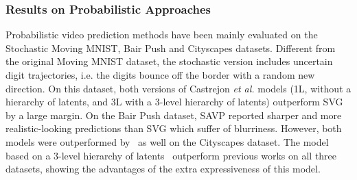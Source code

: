 \subsubsection{Results on Probabilistic Approaches}
Probabilistic video prediction methods have been mainly evaluated on the Stochastic Moving MNIST, Bair Push and Cityscapes datasets. Different from the original Moving MNIST dataset, the stochastic version includes uncertain digit trajectories, i.e. the digits bounce off the border with a random new direction. On this dataset, both versions of Castrejon \textit{et al.} models (1L, without a hierarchy of latents, and 3L with a 3-level hierarchy of latents) outperform \ac{SVG} by a large margin. On the Bair Push dataset, \ac{SAVP} reported sharper and more realistic-looking predictions than \ac{SVG} which suffer of blurriness. However, both models were outperformed by~\cite{Castrejon2019} as well on the Cityscapes dataset. The model based on a 3-level hierarchy of latents~\cite{Castrejon2019} outperform previous works on all three datasets, showing the advantages of the extra expressiveness of this model.


